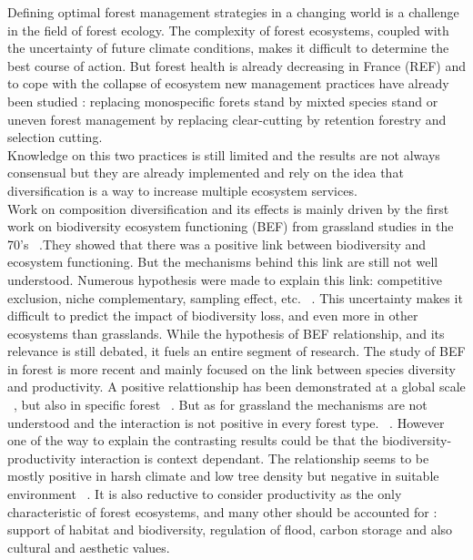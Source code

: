 \documentclass{article}
\begin{document}
Defining optimal forest management strategies in a changing world is a challenge in the field of forest ecology. The complexity of forest ecosystems, coupled with the uncertainty of future climate conditions, makes it difficult to determine the best course of action. 
But forest health is already decreasing in France (REF) and to cope with the collapse of ecosystem new management practices have already been studied : replacing monospecific forets stand by mixted species stand or uneven forest management by replacing clear-cutting by retention forestry and selection cutting.\\
Knowledge on this two practices is still limited and the results are not always consensual but they are already implemented and rely on the idea that diversification is a way to increase multiple ecosystem services.\\
Work on composition diversification and its effects is mainly driven by the first work on biodiversity ecosystem functioning (BEF) from grassland studies in the 70's ~\autocite{tilmanBiodiversityPopulationEcosystem1996}.They showed that there was a positive link between biodiversity and ecosystem functioning. But the mechanisms behind this link are still not well understood. Numerous hypothesis were made to explain this link: competitive exclusion, niche complementary, sampling effect, etc. ~\autocite{aliBiodiversityEcosystemFunctioning2023}. This uncertainty makes it difficult to predict the impact of biodiversity loss, and even more in other ecosystems than grasslands.
While the hypothesis of BEF relationship, and its relevance is still debated, it fuels an entire segment of research.
The study of BEF in forest is more recent and mainly focused on the link between species diversity and productivity. A positive relattionship has been demonstrated at a global scale ~\autocite{liangPositiveBiodiversityproductivityRelationship2016}, but also in specific forest ~\autocite{morinTreeSpeciesRichness2011,paquetteEffectBiodiversityTree2011,jourdanManagingMixedStands2021}. But as for grassland the mechanisms are not understood and the interaction is not positive in every forest type. ~\autocite{forresterReviewProcessesDiversity2016}.
However one of the way to explain the contrasting results could be that the biodiversity-productivity interaction is context dependant. The relationship seems to be mostly positive in harsh climate and low tree density but negative in suitable environment ~\autocite{juckerClimateModulatesEffects2016}.
It is also reductive to consider productivity as the only characteristic of forest ecosystems, and many other should be accounted for : support of habitat and biodiversity, regulation of flood, carbon storage and also cultural and aesthetic values.
\end{document}
